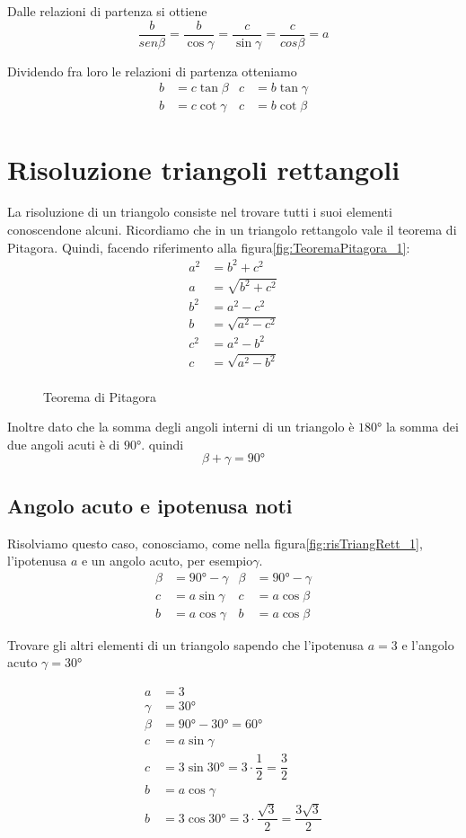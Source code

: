 \noindent Dalle relazioni di partenza si ottiene
\[\dfrac{b}{sen\beta}=\dfrac{b}{\cos\gamma}=\dfrac{c}{\sin\gamma}=\dfrac{c}{cos\beta}=a \]
\begin{teoremat}{}{}
Dividendo fra loro le relazioni di partenza otteniamo
\begin{align*}
b&=c\tan\beta&c&=b\tan\gamma\\
b&=c\cot\gamma&c&=b\cot\beta
\end{align*}
\end{teoremat}
\section{Risoluzione triangoli rettangoli}
La risoluzione di un triangolo consiste nel trovare tutti i suoi elementi conoscendone alcuni. Ricordiamo che in un triangolo rettangolo vale il teorema di Pitagora. Quindi, facendo riferimento alla figura\nobs\vref{fig:TeoremaPitagora_1}:
\begin{align*}
a^2&=b^2+c^2\\
a{}&=\sqrt{b^2+c^2}\\
b^2&=a^2-c^2\\
b{}&=\sqrt{a^2-c^2}\\
c^2&=a^2-b^2\\
c{}&=\sqrt{a^2-b^2}\\
\end{align*}
\begin{figure}
	\centering
	
	\caption{Teorema di Pitagora}
	\label{fig:TeoremaPitagora_1}
\end{figure}
Inoltre dato che la somma degli angoli interni di un triangolo è 
$\ang{180}$ la somma dei due angoli acuti è di $\ang{90}$. quindi
\[\beta+\gamma=\ang{90}\]
\subsection{Angolo acuto e ipotenusa noti}
Risolviamo questo caso, conosciamo, come nella figura\nobs\vref*{fig:risTriangRett_1}, l'ipotenusa $a$ e un angolo acuto, per esempio\nobs$\gamma$.
\begin{align*}
\beta&=\ang{90}-\gamma&\beta&=\ang{90}-\gamma\\
c&=a\sin\gamma&c&=a\cos\beta\\
b&=a\cos\gamma&b&=a\cos\beta
\end{align*}
\begin{esempiot}{}{}
Trovare gli altri elementi di un triangolo sapendo che l'ipotenusa $a=3$ e l'angolo acuto $\gamma=\ang{30}$ 
\end{esempiot}
\begin{align*}
a&=3\\
\gamma&=\ang{30}\\
\beta&=\ang{90}-\ang{30}=\ang{60}\\
c&=a\sin\gamma\\
c&=3\sin\ang{30}=3\cdot\dfrac{1}{2}=\dfrac{3}{2}\\
b&=a\cos\gamma\\
b&=3\cos\ang{30}=3\cdot\dfrac{\sqrt{3}}{2}=\dfrac{3\sqrt{3}}{2}
\end{align*}
